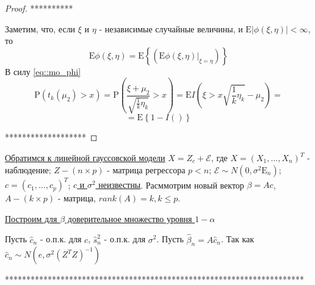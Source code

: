\documentclass[12pt]{article}
\theoremstyle{basic_theorem}
\theoremstyle{name_theorem}
\def\Eps{
    \mathcal{E}
}
\def\E{
    \mathrm{E}
}
\def\P{
    \mathrm{P}
}
\begin{document}
    \begin{proof}
        **********

        Заметим, что, если $\xi$ и $\eta$ - независимые случайные величины,
        и $\E\left\lvert \phi(\xi,\eta) \right\rvert <\infty$, то
        \begin{equation} \label{eq::mo_phi}
            \E\phi(\xi,\eta)=\E\left\{(\E\phi(\xi,\eta)\vert_{\xi=\eta})\right\}
        \end{equation}
        В силу \eqref{eq::mo_phi}
        $$\P(t_k(\mu_2)>x) = \P(\frac{\xi+\mu_2}{\sqrt{\frac{1}{k}\eta_k}}>x)=\E I(\xi>x\sqrt{\frac{1}{k}\eta_k}-\mu_2)=$$
        $$= \E\left\{1-I()\right\}$$

        *******************
    \end{proof}

    \underline{Обратимся к линейной гауссовской модели}
    $X=Z_c+\Eps$, где $X=(X_1,\ldots, X_n)^T$ - наблюдение; $Z - (n\times p)$ - матрица
    регрессора $p<n$; $\Eps\sim N(0, \sigma^2\E_n)$; $c=(c_1,\ldots, c_p)^T$;
    \underline{$c$ и $\sigma^2$ неизвестны}. Расммотрим новый вектор $\beta=Ac$, $A-(k\times p)$ - матрица,
    $rank(A)=k, k\leq p$.

    \underline{Построим для $\beta$ доверительное множество уровня $1-\alpha$}

    Пусть $\widehat{c}_n$ - о.п.к. для $c$, $\widehat{s}^2_n$ - о.п.к. для $\sigma^2$.
    Пусть $\widehat{\beta}_n=A\widehat{c}_n$. Так как $\widehat{c}_n\sim N(e,\sigma^2(Z^TZ)^{-1})$




    **********************************************************************




    
\end{document}
